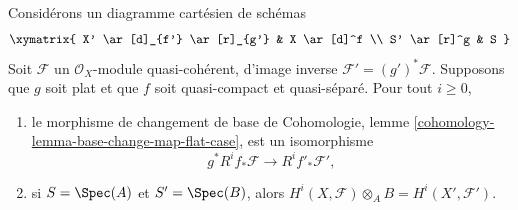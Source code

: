 \begin{lemma}
\label{lemma-flat-base-change-cohomology}
Considérons un diagramme cartésien de schémas
$$
\xymatrix{
X' \ar[d]_{f'} \ar[r]_{g'} & X \ar[d]^f \\
S' \ar[r]^g & S
}
$$
Soit $\mathcal{F}$ un $\mathcal{O}_X$-module
quasi-cohérent, d'image inverse $\mathcal{F}' = (g')^*\mathcal{F}$.
Supposons que $g$ soit plat et que $f$ soit quasi-compact et quasi-séparé.
Pour tout $i \geq 0$,
\begin{enumerate}
\item le morphisme de changement de base
de Cohomologie, lemme \ref{cohomology-lemma-base-change-map-flat-case},
est un isomorphisme
$$
g^*R^if_*\mathcal{F} \longrightarrow R^if'_*\mathcal{F}',
$$
\item si $S = \Spec(A)$ et $S' = \Spec(B)$, alors
$H^i(X, \mathcal{F}) \otimes_A B = H^i(X', \mathcal{F}')$.
\end{enumerate}
\end{lemma}

